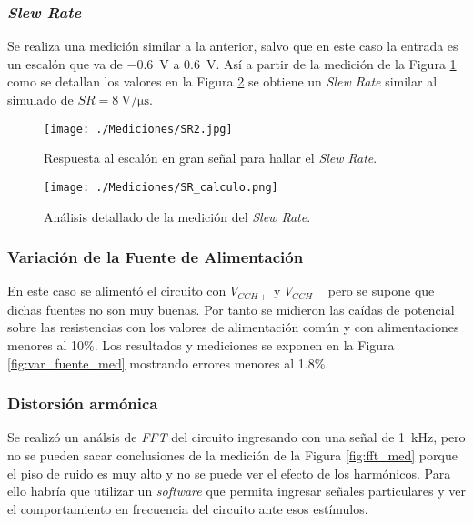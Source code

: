 		\subsubsection{\emph{Slew Rate}}
		Se realiza una medición similar a la anterior, salvo que en este caso la entrada es un escalón que va de \SI{-.6}{\V} a \SI{.6}{\V}. Así a partir de la medición de la Figura \ref{fig:sr_med} como se detallan los valores en la Figura \ref{fig:analisis_sr_med} se obtiene un \emph{Slew Rate} similar al simulado de $\boxed{SR = \SI{8}{\V\per\micro\second}}$.

		\begin{figure}[h!]
			\centering
			\texttt{[image: ./Mediciones/SR2.jpg]}
			\caption{Respuesta al escalón en gran señal para hallar el \emph{Slew Rate}.}
			\label{fig:sr_med}
		\end{figure}

		\begin{figure}[h!]
			\centering
			\texttt{[image: ./Mediciones/SR\_calculo.png]}
			\caption{Análisis detallado de la medición del \emph{Slew Rate}.}
			\label{fig:analisis_sr_med}
		\end{figure}

		\subsubsection{Variación de la Fuente de Alimentación}
		
		En este caso se alimentó el circuito con $V_{CCH+}$ y $V_{CCH-}$ pero se supone que dichas fuentes no son muy buenas. Por tanto se midieron las caídas de potencial sobre las resistencias con los valores de alimentación común y con alimentaciones menores al 10\%. Los resultados y mediciones se exponen en la Figura \ref{fig:var_fuente_med} mostrando errores menores al \num{1.8}\%.


		\subsubsection{Distorsión armónica}
			Se realizó un análsis de \emph{FFT} del circuito ingresando con una señal de \SI{1}{\kHz}, pero no se pueden sacar conclusiones de la medición de la Figura \ref{fig:fft_med} porque el piso de ruido es muy alto y no se puede ver el efecto de los harmónicos. Para ello habría que utilizar un \emph{software} que permita ingresar señales particulares y ver el comportamiento en frecuencia del circuito ante esos estímulos.

